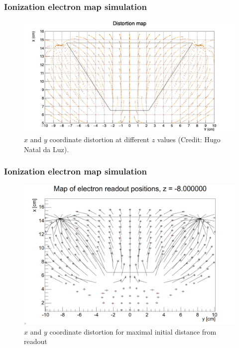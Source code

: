 \documentclass{beamer}
\begin{document}
	\begin{frame}
		\frametitle{Ionization electron map simulation}
		\begin{figure}
			\centering
			\includegraphics[height=0.6\textheight]{../images/map_dist.png}
			\caption{$x$ and $y$ coordinate distortion at different $z$ values (Credit: Hugo Natal da Luz).}
		\end{figure}
	\end{frame}
	\begin{frame}
		\frametitle{Ionization electron map simulation}
		\begin{figure}
			\centering
			\includegraphics[height=0.65\textheight]{../images/map_dist2.png}
			\caption{$x$ and $y$ coordinate distortion for maximal initial distance from readout}
		\end{figure}
	\end{frame}
\end{document}
